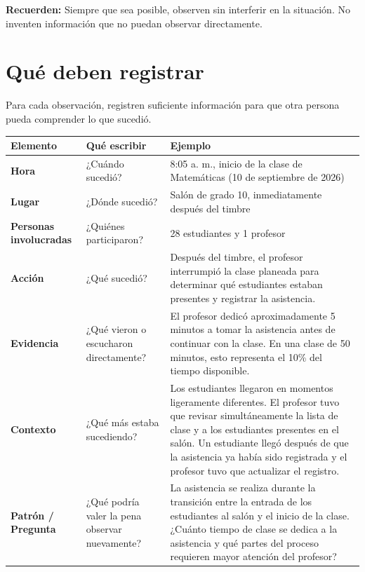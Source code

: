\documentclass[12pt,a4paper]{article}
\begin{document}
	\vspace{0.2cm}
	
	\textbf{Recuerden:} Siempre que sea posible, observen sin interferir en la situación. No inventen información que no puedan observar directamente.
	
	\section*{Qué deben registrar}
	
	Para cada observación, registren suficiente información para que otra persona pueda comprender lo que sucedió.
	
	\vspace{-1.5mm}\begin{center}
		\small
		\begin{tabular}{|L{0.17\textwidth}|L{0.24\textwidth}|L{0.46\textwidth}|}
			\hline
			\textbf{Elemento} & \textbf{Qué escribir} & \textbf{Ejemplo} \\
			\hline
			\textbf{Hora} & ¿Cuándo sucedió? 
			& 8:05 a. m., inicio de la clase de Matemáticas (10 de septiembre de 2026) \\
			\hline
			\textbf{Lugar} & ¿Dónde sucedió? 
			& Salón de grado 10, inmediatamente después del timbre \\
			\hline
			\textbf{Personas involucradas} & ¿Quiénes participaron? 
			& 28 estudiantes y 1 profesor \\
			\hline
			\textbf{Acción} & ¿Qué sucedió? 
			& Después del timbre, el profesor interrumpió la clase planeada para determinar qué estudiantes estaban presentes y registrar la asistencia. \\
			\hline
			\textbf{Evidencia} & ¿Qué vieron o escucharon directamente? 
			& El profesor dedicó aproximadamente 5 minutos a tomar la asistencia antes de continuar con la clase. En una clase de 50 minutos, esto representa el 10\% del tiempo disponible. \\
			\hline
			\textbf{Contexto} & ¿Qué más estaba sucediendo? 
			& Los estudiantes llegaron en momentos ligeramente diferentes. El profesor tuvo que revisar simultáneamente la lista de clase y a los estudiantes presentes en el salón. Un estudiante llegó después de que la asistencia ya había sido registrada y el profesor tuvo que actualizar el registro. \\
			\hline
			\textbf{Patrón / Pregunta} & ¿Qué podría valer la pena observar nuevamente? 
			& La asistencia se realiza durante la transición entre la entrada de los estudiantes al salón y el inicio de la clase. ¿Cuánto tiempo de clase se dedica a la asistencia y qué partes del proceso requieren mayor atención del profesor? \\
			\hline
		\end{tabular}
	\end{center}\vspace{-1.5mm}
	
\end{document}
